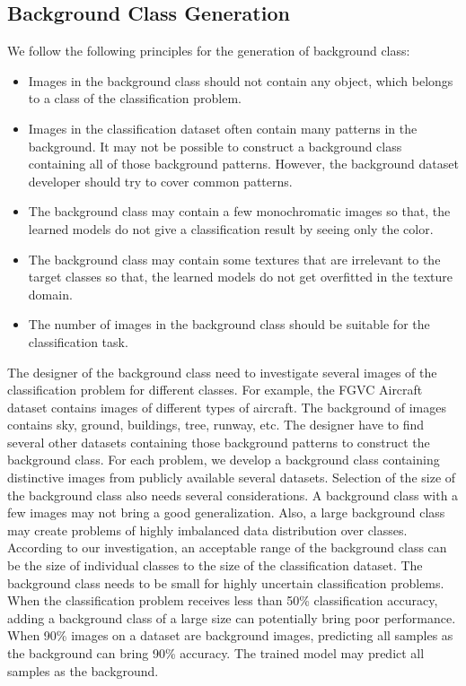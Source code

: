 \documentclass{article}
\begin{document}
\subsection{Background Class Generation}
We follow the following principles for the generation of background class:
\begin{itemize}
  \item Images in the background class should not contain any object, which belongs to a class of the classification problem. 
  \item Images in the classification dataset often contain many patterns in the background. It may not be possible to construct a background class containing all of those background patterns. However, the background dataset developer should try to cover common patterns.
 \item The background class may contain a few monochromatic images so that, the learned models do not give a classification result by seeing only the color. 
 \item The background class may contain some textures that are irrelevant to the target classes so that, the learned models do not get overfitted in the texture domain. 
  \item The number of images in the background class should be suitable for the classification task. 
\end{itemize}
The designer of the background class need to investigate several images of the classification problem for different classes. For example, the FGVC Aircraft dataset contains images of different types of aircraft. The background of images contains sky, ground, buildings, tree, runway, etc. The designer have to find several other datasets containing those background patterns to construct the background class. For each problem, we develop a background class containing distinctive images from publicly available several datasets. 
Selection of the size of the background class also needs several considerations. A background class with a few images may not bring a good generalization. Also, a large background class may create problems of highly imbalanced data distribution over classes. According to our investigation, an acceptable range of the background class can be the size of individual classes to the size of the classification dataset. The background class needs to be small for highly uncertain classification problems. When the classification problem receives less than 50\% classification accuracy, adding a background class of a large size can potentially bring poor performance. When 90\% images on a dataset are background images, predicting all samples as the background can bring 90\% accuracy. The trained model may predict all samples as the background. 
\end{document}
